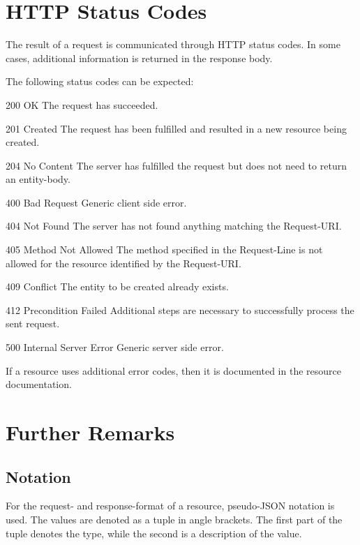 \documentclass[10pt,a4paper]{scrartcl}
\begin{document}
\pagebreak


\section{HTTP Status Codes}

The result of a request is communicated through HTTP status codes. In some
cases, additional information is returned in the response body.

The following status codes can be expected:

\begin{description*}
	\item[200 OK] The request has succeeded.
	\item[201 Created] The request has been fulfilled and resulted in a new
		resource being created.
	\item[204 No Content] The server has fulfilled the request but does not need
		to return an entity-body.
	\item[400 Bad Request] Generic client side error.
	\item[404 Not Found] The server has not found anything matching the
		Request-URI.
	\item[405 Method Not Allowed] The method specified in the Request-Line is not
		allowed for the resource identified by the Request-URI.
	\item[409 Conflict] The entity to be created already exists.
	\item[412 Precondition Failed] Additional steps are necessary to successfully
		process the sent request.
	\item[500 Internal Server Error] Generic server side error.
\end{description*}

If a resource uses additional error codes, then it is documented in the resource
documentation.

\pagebreak


\section{Further Remarks}

\subsection{Notation}

For the request- and response-format of a resource, pseudo-JSON notation is
used. The values are denoted as a tuple in angle brackets. The first part of the
tuple denotes the type, while the second is a description of the value.
\end{document}
